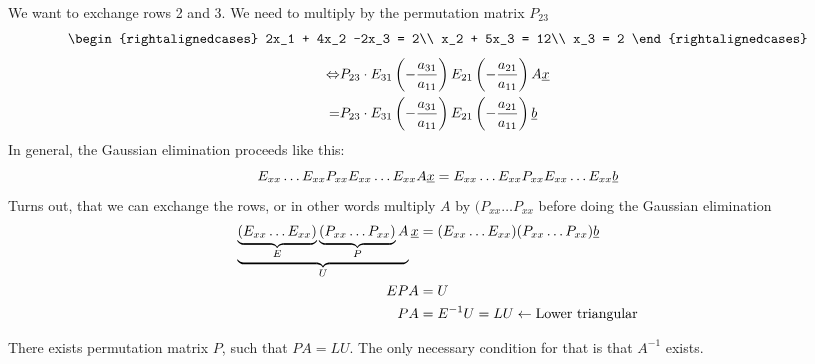 \begin{example}
We want to exchange rows 2 and 3. We need to multiply by the permutation matrix $P_{23}$
\[
\begin{rightalignedcases}
2x_1 + 4x_2 -2x_3 = 2\\
x_2 + 5x_3 = 12\\
x_3 = 2
\end{rightalignedcases}
\]
\begin{align*}
\Leftrightarrow &P_{23}\cdot E_{31}\left( -\frac{a_{31}}{a_{11}}\right)E_{21}\left( -\frac{a_{21}}{a_{11}}\right)A\underline{x} \\
= & P_{23}\cdot E_{31}\left( -\frac{a_{31}}{a_{11}}\right)E_{21}\left( -\frac{a_{21}}{a_{11}}\right)\underline{b}
\end{align*} 
In general, the Gaussian elimination proceeds like this:
\[
E_{xx}\dots E_{xx}P_{xx}E_{xx} \dots  E_{xx}A\underline{x} = E_{xx}\dots E_{xx}P_{xx}E_{xx}\dots E_{xx}\underline{b}
\]
Turns out, that we can exchange the rows, or in other words multiply $A$ by $(P_{xx}\dots P_{xx}$ before doing the Gaussian elimination
\begin{align*}
\underbrace{\underbrace{(E_{xx}\dots E_{xx})}_{E}\underbrace{(P_{xx}\dots P_{xx})}_{P}A}_{U}\underline{x} &= (E_{xx}\dots E_{xx})(P_{xx}\dots P_{xx})\underline{b} \\
EPA &= U\\
PA &= E^{-1} U = LU \leftarrow \text{Lower triangular}
\end{align*}
\end{example}
\begin{theorem}
There exists permutation matrix $P$, such that $PA = LU$. The only necessary condition for that is that $A^{-1}$ exists.
\end{theorem}
